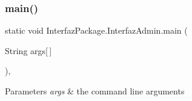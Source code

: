 \subsubsection{\texorpdfstring{main()}{main()}}
{\footnotesize\ttfamily static void Interfaz\+Package.\+Interfaz\+Admin.\+main (\begin{DoxyParamCaption}\item[{String}]{args\mbox{[}$\,$\mbox{]} }\end{DoxyParamCaption})\hspace{0.3cm}{\ttfamily [inline]}, {\ttfamily [static]}}


\begin{DoxyParams}{Parameters}
{\em args} & the command line arguments \\
\hline
\end{DoxyParams}

